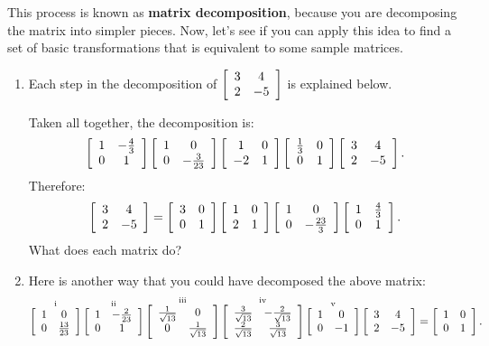 \documentclass[../textbook.tex]{subfiles}
\begin{document}
\noindent This process is known as \textbf{matrix decomposition}, because you are decomposing the matrix into simpler pieces. Now, let's see if you can apply this idea to find a set of basic transformations that is equivalent to some sample matrices.

\begin{enumerate}
\setcounter{enumi}{\value{problem_i}}
\item \label{prob:needed_for_matrix_undo1}Each step in the decomposition of $\left[\begin{array}{cc} 3 & 4 \\ 2 & -5 \end{array}\right]$ is explained below.
\begin{enumerate}[label=(\roman*)]
\end{enumerate}
Taken all together, the decomposition is:
$$\left[\begin{array}{cc} 1 & -\frac{4}{3} \\ 0 & 1 \end{array}\right]\left[\begin{array}{cc} 1 & 0 \\ 0 & -\frac{3}{23} \end{array}\right]\left[\begin{array}{cc} 1 & 0 \\ -2 & 1 \end{array}\right]\left[\begin{array}{cc} \frac{1}{3} & 0 \\ 0 & 1 \end{array}\right]\left[\begin{array}{cc} 3 & 4 \\ 2 & -5 \end{array}\right].$$
Therefore: $$\left[\begin{array}{cc} 3 & 4 \\ 2 & -5 \end{array}\right]=\left[\begin{array}{cc} 3 & 0 \\ 0 & 1 \end{array}\right]\left[\begin{array}{cc} 1 & 0 \\ 2 & 1 \end{array}\right]\left[\begin{array}{cc} 1 & 0 \\ 0 & -\frac{23}{3} \end{array}\right]\left[\begin{array}{cc} 1 & \frac{4}{3} \\ 0 & 1 \end{array}\right].$$
What does each matrix do?
\item\label{prob:needed_for_matrix_undo2}Here is another way that you could have decomposed the above matrix:
\vspace{-1em}
$$\mathop{\left[\begin{array}{cc} 1 & 0 \\ 0 & \frac{13}{23} \end{array}\right]}^{\text{i}}
\mathop{\left[\begin{array}{cc} 1 & -\frac{2}{23} \\ 0 & 1 \end{array}\right]}^{\text{ii}}
\mathop{\left[\begin{array}{cc} \frac{1}{\sqrt{13}} & 0 \\ 0 & \frac{1}{\sqrt{13}} \end{array}\right]}^{\text{iii}}
\mathop{\left[\begin{array}{cc} \frac{3}{\sqrt{13}} & -\frac{2}{\sqrt{13}} \\ \frac{2}{\sqrt{13}} & \frac{3}{\sqrt{13}} \end{array}\right]}^{\text{iv}}
\mathop{\left[\begin{array}{cc} 1 & 0 \\ 0 & -1 \end{array}\right]}^{\text{v}}
\left[\begin{array}{cc} 3 & 4 \\ 2 & -5 \end{array}\right]=\left[\begin{array}{cc} 1 & 0 \\ 0 & 1 \end{array}\right].$$
\begin{enumerate}

\end{enumerate}
\end{enumerate}
\end{document}
